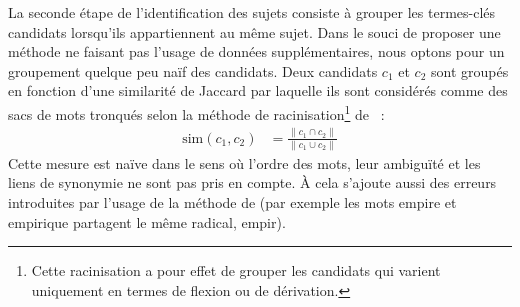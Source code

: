        La seconde étape de l'identification des sujets consiste à grouper les
        termes-clés candidats lorsqu'ils appartiennent au même sujet. Dans le
        souci de proposer une méthode ne faisant pas l'usage de données
        supplémentaires, nous optons pour un groupement quelque peu naïf des
        candidats. Deux candidats $c_1$ et $c_2$ sont groupés en fonction d'une
        similarité de Jaccard par laquelle ils sont considérés comme des sacs de
        mots tronqués selon la méthode de racinisation\footnote{Cette
        racinisation a pour effet de grouper les candidats qui varient
        uniquement en termes de flexion ou de dérivation.} de
        ~:
        \begin{align}
          \text{sim}(c_1, c_2) &= \frac{\|c_1 \cap c_2\|}{\|c_1 \cup c_2\|} \label{equa:jaccard}
        \end{align}
        Cette mesure est naïve dans le sens où l'ordre des mots, leur ambiguïté
        et les liens de synonymie ne sont pas pris en compte. À cela s'ajoute
        aussi des erreurs introduites par l'usage de la méthode de
         (par exemple les mots
        \og{}empire\fg{} et \og{}empirique\fg{} partagent le même radical,
        \og{}empir\fg{}).

